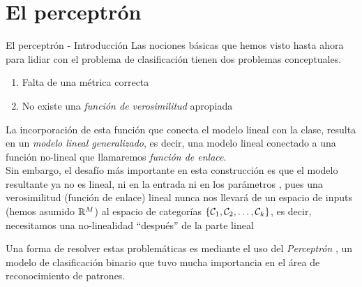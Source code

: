 \documentclass[9pt]{beamer}
\begin{document}
\section{El perceptrón}

\begin{frame}{El perceptrón - Introducción}
Las nociones básicas que hemos visto hasta ahora para lidiar con el problema de clasificación tienen dos problemas conceptuales. \pause
\begin{enumerate}
  \item Falta de una métrica correcta \pause
  \item No existe una \emph{función de verosimilitud} apropiada \pause
\end{enumerate}
La incorporación de esta función que conecta el modelo lineal con la clase, resulta en un \emph{modelo lineal generalizado}, es decir, una modelo lineal conectado a una  función no-lineal que llamaremos \emph{función de enlace}.\\ \pause
Sin embargo, el desafío más importante en esta construcción es que el modelo resultante ya no es lineal, ni en la entrada ni en los parámetros , pues una verosimilitud (función de enlace) lineal nunca nos llevará de un espacio de inputs (hemos asumido $\mathbb{R}^M$) al espacio de categorías $\{{\mathcal C}_1,{\mathcal C}_2,\ldots,{\mathcal C}_k\}$, es decir, necesitamos una no-linealidad ``después'' de la parte lineal \\ \pause

Una forma de resolver estas problemáticas es mediante el uso del \emph{Perceptrón} \cite{rosenblatt_1958}, un modelo de clasificación binario que tuvo mucha importancia en el área de reconocimiento de patrones.

\end{frame}
\end{document}
